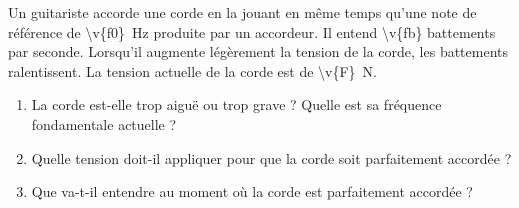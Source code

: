 Un guitariste accorde une corde en la jouant en même temps qu'une note de référence de \qty{\v{f0}}{Hz} produite par un accordeur. Il entend \num{\v{fb}} battements par seconde. Lorsqu'il augmente légèrement la tension de la corde, les battements ralentissent. La tension actuelle de la corde est de \qty{\v{F}}{N}.

\begin{enumerate}[label=\alph*)]
    \item La corde est-elle trop aiguë ou trop grave ? Quelle est sa fréquence fondamentale actuelle ?
    \item Quelle tension doit-il appliquer pour que la corde soit parfaitement accordée ?
    \item Que va-t-il entendre au moment où la corde est parfaitement accordée ?
\end{enumerate}
